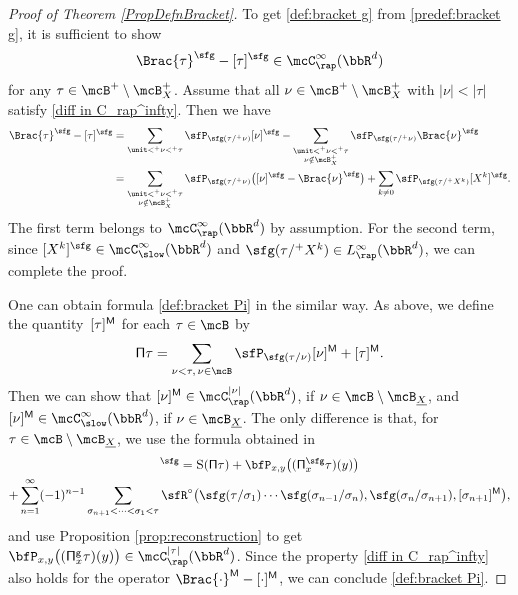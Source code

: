 \begin{proof}[Proof of Theorem \ref{PropDefnBracket}]
To get \eqref{def:bracket g} from \eqref{predef:bracket g}, it is sufficient to show
\begin{align}\label{diff in C_rap^infty}
\Brac{\tau}^\sfg-[\tau]^\sfg\in \mcC_\rap^\infty(\bbR^d)
\end{align}
for any $\tau\in\mcB^+\setminus\mcB_X^+$. Assume that all $\nu\in\mcB^+\setminus\mcB_X^+$ with $|\nu|<|\tau|$ satisfy \eqref{diff in C_rap^infty}. Then we have
\begin{align*}
\Brac{\tau}^\sfg-[\tau]^\sfg &= \sum_{\unit<^+\nu<^+\tau}\sfP_{\sfg(\tau/^+\nu)}[\nu]^\sfg-\sum_{\substack{\unit<^+\nu<^+\tau\\\nu\notin\mcB_X^+}}\sfP_{\sfg(\tau/^+\nu)}\Brac{\nu}^\sfg \\
&= \sum_{\substack{\unit<^+\nu<^+\tau\\\nu\notin\mcB_X^+}}\sfP_{\sfg(\tau/^+\nu)}\bigl([\nu]^\sfg-\Brac{\nu}^\sfg\bigr) + \sum_{k\neq0}\sfP_{\sfg(\tau/^+X^k)}[X^k]^\sfg.
\end{align*}
The first term belongs to $\mcC_\rap^\infty(\bbR^d)$ by assumption. For the second term, since $[X^k]^\sfg\in \mcC_\slow^\infty(\bbR^d)$ and $\sfg(\tau/^+X^k)\in L_\rap^\infty(\bbR^d)$, we can complete the proof.

One can obtain formula \eqref{def:bracket Pi} in the similar way. As above, we define the quantity~$[\tau]^{\sf M}$ for each $\tau\in\mcB$ by
\begin{align*}
{\sf\Pi}\tau=\sum_{\nu<\tau,\, \nu\in\mcB}\sfP_{\sfg(\tau/\nu)}[\nu]^{\sf M}+[\tau]^{\sf M}.
\end{align*}
Then we can show that $[\nu]^{\sf M}\in \mcC_\rap^{|\nu|}(\bbR^d)$, if $\nu\in\mcB\setminus\mcB_{\underline{X}}$, and $[\nu]^{\sf M}\in \mcC_\slow^\infty(\bbR^d)$, if $\nu\in\mcB_{\underline{X}}$.
The only difference is that, for $\tau\in\mcB\setminus\mcB_{\underline{X}}$, we use the formula obtained in~\cite{BH}
\begin{multline*}
[\tau]^\sfg = \textsc{S}({\sf\Pi}\tau)+\bfP_{x,y}\bigl(({\sf\Pi}_x^{\sfg}\tau)(y)\bigr) \\
+ \sum_{n=1}^\infty(-1)^{n-1}\sum_{\sigma_{n+1}<\cdots<\sigma_1<\tau} {\sfR}^\circ\bigl(\sfg(\tau/\sigma_1)\cdots\sfg(\sigma_{n-1}/\sigma_n),\sfg(\sigma_n/\sigma_{n+1}),[\sigma_{n+1}]^{\sf M}\bigr),
\end{multline*}
and use Proposition \ref{prop:reconstruction} to get $\bfP_{x,y}\bigl(({\sf\Pi}_x^{\sf g}\tau)(y)\bigr)\in \mcC_\rap^{|\tau|}(\bbR^d)$.
Since the property \eqref{diff in C_rap^infty} also holds for the operator $\Brac{\cdot}^{\sf M}-[\cdot]^{\sf M}$, we can conclude \eqref{def:bracket Pi}.
\end{proof}

